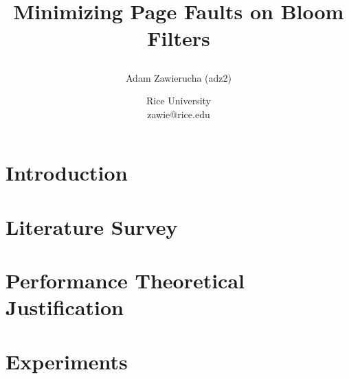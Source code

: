 \documentclass[a4paper]{article}
\title{Minimizing Page Faults on Bloom Filters
\author{Adam Zawierucha (adz2)}

\date{
	Rice University \\ zawie@rice.edu}%
}
\theoremstyle{plain}
\theoremstyle{definition}
\begin{document}
	\maketitle
	
	\begin{abstract}
		
	\end{abstract}
	

	\section{Introduction}
	

	\section{Literature Survey}
	

	\section{Performance Theoretical Justification}
	

	\section{Experiments}
	



	
	

	
\end{document}

